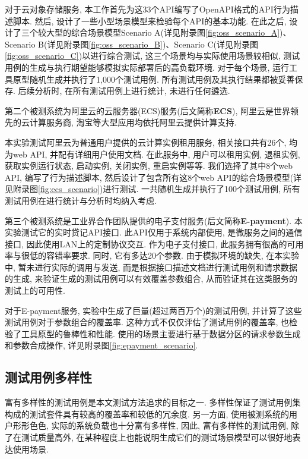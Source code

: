             对于云对象存储服务, 本工作首先为这33个API编写了OpenAPI格式的API行为描述脚本. 然后, 设计了一些小型场景模型来检验每个API的基本功能. 在此之后, 设计了三个较大型的综合场景模型Scenario A(详见附录图\ref{fig:oss_scenario_A})、Scenario B(详见附录图\ref{fig:oss_scenario_B})、Scenario C(详见附录图\ref{fig:oss_scenario_C})以进行综合测试, 这三个场景均与实际使用场景较相似, 测试用例的生成与执行期望能够模拟实际部署后的高负载环境. 对于每个场景, 运行工具原型随机生成并执行了1,000个测试用例. 所有测试用例及其执行结果都被妥善保存. 后续分析时, 在所有测试用例上进行统计, 未进行任何遴选.
            
            第二个被测系统为阿里云的云服务器(ECS)服务(后文简称\textbf{ECS}), 阿里云是世界领先的云计算服务商, 淘宝等大型应用均依托阿里云提供计算支持. 
            
            本实验测试阿里云为普通用户提供的云计算实例租用服务, 相关接口共有26个, 均为web API, 并配有详细用户使用文档. 在此服务中, 用户可以租用实例, 退租实例, 获取实例运行状态, 启动实例, 关闭实例, 重启实例等等. 我们选择了其中8个web API, 编写了行为描述脚本, 然后设计了包含所有这8个web API的综合场景模型(详见附录图\ref{fig:ecs_scenario})进行测试. 一共随机生成并执行了100个测试用例, 所有测试用例在进行统计与分析时均纳入考虑.
            
            第三个被测系统是工业界合作团队提供的电子支付服务(后文简称\textbf{E-payment}). 本实验测试它的实时贷记API接口. 此API仅用于系统内部使用, 是微服务之间的通信接口, 因此使用LAN上的定制协议交互. 作为电子支付接口, 此服务拥有很高的可用率与很低的容错率要求. 同时, 它有多达20个参数. 由于模拟环境的缺失, 在本实验中, 暂未进行实际的调用与发送, 而是根据接口描述文档进行测试用例和请求数据的生成, 来验证生成的测试用例可以有效覆盖参数组合, 从而验证其在这类服务的测试上的可用性.
            
            对于E-payment服务, 实验中生成了巨量(超过两百万个)的测试用例, 并计算了这些测试用例对于参数组合的覆盖率. 这种方式不仅仅评估了测试用例的覆盖率, 也检验了工具原型的鲁棒性和性能. 使用的场景主要进行基于数据分区的请求参数生成和参数合成操作, 详见附录图\ref{fig:epayment_scenario}.
            
        \subsection{测试用例多样性}
            富有多样性的测试用例是本文测试方法追求的目标之一. 多样性保证了测试用例集构成的测试套件具有较高的覆盖率和较低的冗余度. 另一方面, 使用被测系统的用户形形色色, 实际的系统负载也十分富有多样性, 因此, 富有多样性的测试用例, 除了在测试质量高外, 在某种程度上也能说明生成它们的测试场景模型可以很好地表达使用场景.
            
